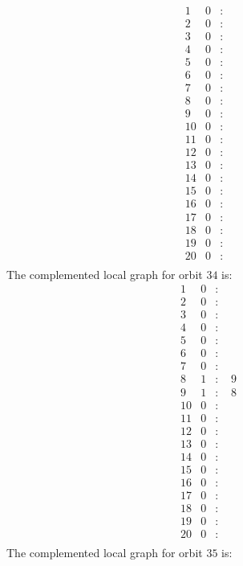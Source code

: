 \documentclass[12pt]{article}
\begin{document}
\begin{equation*}
\begin{array}{rrcl}
1&0&:&\\
2&0&:&\\
3&0&:&\\
4&0&:&\\
5&0&:&\\
6&0&:&\\
7&0&:&\\
8&0&:&\\
9&0&:&\\
10&0&:&\\
11&0&:&\\
12&0&:&\\
13&0&:&\\
14&0&:&\\
15&0&:&\\
16&0&:&\\
17&0&:&\\
18&0&:&\\
19&0&:&\\
20&0&:&\\
\end{array}
\end{equation*}
The complemented local graph for orbit $34$ is:
\begin{equation*}
\begin{array}{rrcl}
1&0&:&\\
2&0&:&\\
3&0&:&\\
4&0&:&\\
5&0&:&\\
6&0&:&\\
7&0&:&\\
8&1&:&\,\,9\\
9&1&:&\,\,8\\
10&0&:&\\
11&0&:&\\
12&0&:&\\
13&0&:&\\
14&0&:&\\
15&0&:&\\
16&0&:&\\
17&0&:&\\
18&0&:&\\
19&0&:&\\
20&0&:&\\
\end{array}
\end{equation*}
The complemented local graph for orbit $35$ is:
\end{document}
